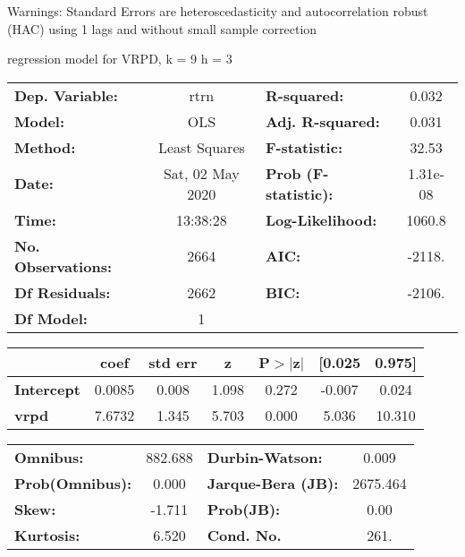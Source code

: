 Warnings: \newline
 [1] Standard Errors are heteroscedasticity and autocorrelation robust (HAC) using 1 lags and without small sample correction\ 

regression model for VRPD, k = 9 h = 3\begin{center}
\begin{tabular}{lclc}
\toprule
\textbf{Dep. Variable:}    &       rtrn       & \textbf{  R-squared:         } &     0.032   \\
\textbf{Model:}            &       OLS        & \textbf{  Adj. R-squared:    } &     0.031   \\
\textbf{Method:}           &  Least Squares   & \textbf{  F-statistic:       } &     32.53   \\
\textbf{Date:}             & Sat, 02 May 2020 & \textbf{  Prob (F-statistic):} &  1.31e-08   \\
\textbf{Time:}             &     13:38:28     & \textbf{  Log-Likelihood:    } &    1060.8   \\
\textbf{No. Observations:} &        2664      & \textbf{  AIC:               } &    -2118.   \\
\textbf{Df Residuals:}     &        2662      & \textbf{  BIC:               } &    -2106.   \\
\textbf{Df Model:}         &           1      & \textbf{                     } &             \\
\bottomrule
\end{tabular}
\begin{tabular}{lcccccc}
                   & \textbf{coef} & \textbf{std err} & \textbf{z} & \textbf{P$> |$z$|$} & \textbf{[0.025} & \textbf{0.975]}  \\
\midrule
\textbf{Intercept} &       0.0085  &        0.008     &     1.098  &         0.272        &       -0.007    &        0.024     \\
\textbf{vrpd}      &       7.6732  &        1.345     &     5.703  &         0.000        &        5.036    &       10.310     \\
\bottomrule
\end{tabular}
\begin{tabular}{lclc}
\textbf{Omnibus:}       & 882.688 & \textbf{  Durbin-Watson:     } &    0.009  \\
\textbf{Prob(Omnibus):} &   0.000 & \textbf{  Jarque-Bera (JB):  } & 2675.464  \\
\textbf{Skew:}          &  -1.711 & \textbf{  Prob(JB):          } &     0.00  \\
\textbf{Kurtosis:}      &   6.520 & \textbf{  Cond. No.          } &     261.  \\
\bottomrule
\end{tabular}
\end{center}

